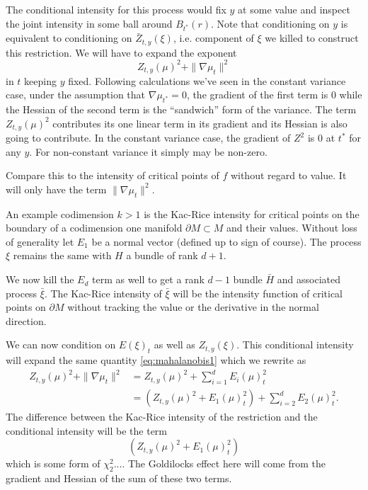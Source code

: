 \documentclass{article}
\newcommand{\randsec}{\xi}
\begin{document}
The conditional intensity for this process would fix $y$ at some value and inspect the joint intensity
in some ball around $B_{t^*}(r)$. Note that conditioning on $y$ is equivalent to conditioning on $\bar{Z}_{t,y}(\randsec)$, i.e. component of $\randsec$ we killed to construct this restriction.
We will have to expand the exponent
\begin{equation}
  \label{eq:mahalanobis1}
Z_{t,y}(\mu)^2 + \|\nabla \mu_t\|^2
\end{equation}
in $t$ keeping $y$ fixed. Following calculations we've seen in the constant variance case, under
the assumption that $\nabla \mu_{t^*}=0$, the gradient of the first term is 0 while
the Hessian of the second term is the ``sandwich'' form of the variance.
The term $Z_{t,y}(\mu)^2$ contributes its one linear term in its gradient and its Hessian is
also going to contribute. In the constant variance case, the gradient of $Z^2$ is 0 at $t^*$ for any $y$. For non-constant variance it simply may be non-zero.

Compare this to the intensity of critical points of $f$ without regard to value. It will only have the
term $\|\nabla \mu_t\|^2$.

An example codimension $k>1$ is the Kac-Rice intensity for critical points
on the boundary of a codimension one manifold $\partial M \subset M$ and their values. Without loss of generality
let $E_1$ be a normal vector (defined up to sign of course). The process
$\randsec$ remains the same with $H$ a bundle of rank $d+1$.

We now kill the $E_d$ term as well to get a rank $d-1$ bundle $\bar{H}$ and associated process
$\bar{\randsec}$. The Kac-Rice intensity of $\bar{\randsec}$ will be the intensity function of critical
points on $\partial M$ without tracking the value or the derivative in the normal direction.

We can now condition on $E(\randsec)_{t}$ as well as $Z_{t,y}(\randsec)$. This conditional intensity
will expand the same quantity \eqref{eq:mahalanobis1} which we rewrite as
$$
\begin{aligned}
  \label{eq:mahalanobis1}
  Z_{t,y}(\mu)^2 + \|\nabla \mu_t\|^2 &= Z_{t,y}(\mu)^2 + \sum_{i=1}^d E_i(\mu)_t^2 \\
  & = \left(Z_{t,y}(\mu)^2 + E_1(\mu)_t^2\right) + \sum_{i=2}^d E_2(\mu)_t^2.
  \end{aligned}
$$
The difference between the Kac-Rice intensity of the restriction and the conditional
intensity will be the term
$$
\left(Z_{t,y}(\mu)^2 + E_1(\mu)_t^2\right)
$$
which is some form of $\chi^2_2...$. The Goldilocks effect here will come
from the gradient and Hessian of the sum of these two terms.
\end{document}
